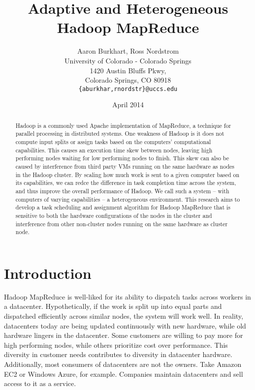 \documentclass{sig-alternate}
\begin{document}
\title{Adaptive and Heterogeneous Hadoop MapReduce}
\author{Aaron Burkhart, Ross Nordstrom\\
        University of Colorado - Colorado Springs\\
        1420 Austin Bluffs Pkwy,\\
        Colorado Springs, CO 80918\\
        \texttt{\{aburkhar,rnordstr\}@uccs.edu}
       }
\date{April 2014}

\maketitle

\begin{abstract}
Hadoop is a commonly used Apache implementation of MapReduce, a technique for
parallel processing in distributed systems. One weakness of Hadoop is it does
not compute input splits or assign tasks based on the computers' computational capabilities.
This causes an execution time skew between nodes, leaving high performing nodes waiting
for low performing nodes to finish. This skew can also be caused by interference from
third party VMs running on the same hardware as nodes in the Hadoop cluster. By scaling
how much work is sent to a given computer based on its capabilities, we can
redce the difference in task completion time across the system, and thus improve
the overall performance of Hadoop. We call such a system – with computers of
varying capabilities – a heterogeneous environment. This research aims to develop
a task scheduling and assignment algorithm for Hadoop MapReduce that is sensitive
to both the hardware configurations of the nodes in the cluster and interference
from other non-cluster nodes running on the same hardware as cluster node.
\end{abstract}


\section{Introduction}
Hadoop MapReduce is well-liked for its ability to dispatch tasks across workers
in a datacenter. Hypothetically, if the work is split up into equal parts and dispatched
efficiently across similar nodes, the system will work well. In reality, datacenters today are being
updated continuously with new hardware, while old hardware lingers in the datacenter. 
Some customers are willing to pay more for high performing nodes, while others prioritize cost over
performance. This diversity in customer needs contributes to diversity in datacenter hardware. 
Additionally, most consumers of datacenters are not the owners. Take Amazon EC2
or Windows Azure, for example. Companies maintain datacenters and sell access to
it as a service.
\end{document}
